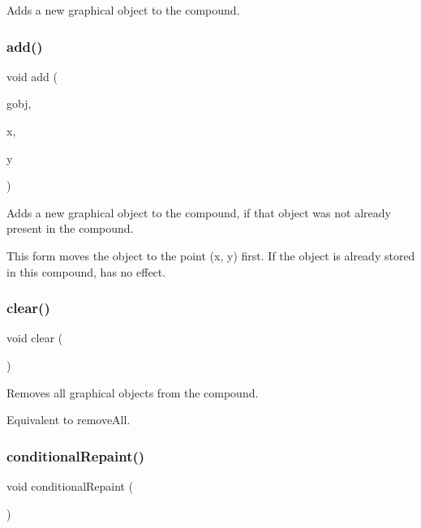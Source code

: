 Adds a new graphical object to the compound. 

\mbox{\label{classGCompound_a5b11b532869632a6c26b098b0858eac5}} 
\subsubsection{\texorpdfstring{add()}{add()}\hspace{0.1cm}{\footnotesize\ttfamily [4/4]}}
{\footnotesize\ttfamily void add (\begin{DoxyParamCaption}\item[{\mbox{\hyperlink{classGObject}{G\+Object}} \&}]{gobj,  }\item[{double}]{x,  }\item[{double}]{y }\end{DoxyParamCaption})\hspace{0.3cm}{\ttfamily [virtual]}}



Adds a new graphical object to the compound, if that object was not already present in the compound. 

This form moves the object to the point ({\ttfamily x}, {\ttfamily y}) first. If the object is already stored in this compound, has no effect. \mbox{\label{classGCompound_ac8bb3912a3ce86b15842e79d0b421204}} 
\subsubsection{\texorpdfstring{clear()}{clear()}}
{\footnotesize\ttfamily void clear (\begin{DoxyParamCaption}{ }\end{DoxyParamCaption})\hspace{0.3cm}{\ttfamily [virtual]}}



Removes all graphical objects from the compound. 

Equivalent to remove\+All. \mbox{\label{classGCompound_a221b3e75bb3d9d0bfea62b3364e6773b}} 
\subsubsection{\texorpdfstring{conditional\+Repaint()}{conditionalRepaint()}}
{\footnotesize\ttfamily void conditional\+Repaint (\begin{DoxyParamCaption}{ }\end{DoxyParamCaption})\hspace{0.3cm}{\ttfamily [virtual]}}



